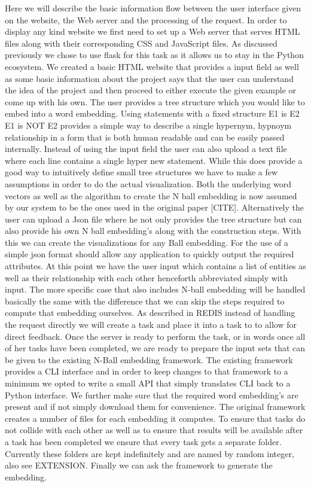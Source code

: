 \documentclass[]{article}
\begin{document}
Here we will describe the basic information flow between the user interface given on the website, the Web server and the processing of the request. In order to display any kind website we first need to set up a Web server that serves HTML files along with their corresponding CSS and JavaScript files. As discussed previously we chose to use flask for this task as it allows us to stay in the Python ecosystem. We created a basic HTML website that provides a input field as well as some basic information about the project says that the user can understand the idea of the project and then proceed to either execute the given example or come up with his own. 
The user provides a tree structure which you would like to embed into a word embedding. Using statements with a fixed structure
E1 is E2
E1 is NOT E2
provides a simple way to describe a single hypernym, hypnoym relationship in a form that is both human readable and can be easily passed internally. Instead of using the input field the user can also upload a text file where each line contains a single hyper new statement. While this does provide a good way to intuitively define small tree structures we have to make a few assumptions in order to do the actual visualization. Both the underlying word vectors as well as the algorithm to create the N ball embedding is now assumed by our system to be the ones used in the original paper [CITE]. Alternatively the user can upload a Json file where he not only provides the tree structure but can also provide his own N ball embedding's along with the construction steps. With this we can create the visualizations for any Ball embedding. For the use of a simple json format should allow any application to quickly output the required attributes. 
At this point we have the user input which contains a list of entities as well as their relationship with each other henceforth abbreviated simply with input. The more specific case that also includes N-ball embedding will be handled basically the same with the difference that we can skip the steps required to compute that embedding ourselves. As described in REDIS instead of handling the request directly we will create a task and place it into a task to to allow for direct feedback.  
Once the server is ready to perform the task, or in words once all of her tasks have been completed, we are ready to prepare the input sets that can be given to the existing N-Ball embedding framework. The existing framework provides a CLI interface and in order to keep changes to that framework to a minimum we opted to write a small API that simply translates CLI back to a Python interface. We further make sure that the required word embedding's are present and if not simply download them for convenience. The original framework creates a number of files for each embedding it computes. To ensure that tasks do not collide with each other as well as to ensure that results will be available after a task has been completed we ensure that every task gets a separate folder. Currently these folders are kept indefinitely and are named by random integer, also see EXTENSION. Finally we can ask the framework to generate the embedding.
\end{document}

